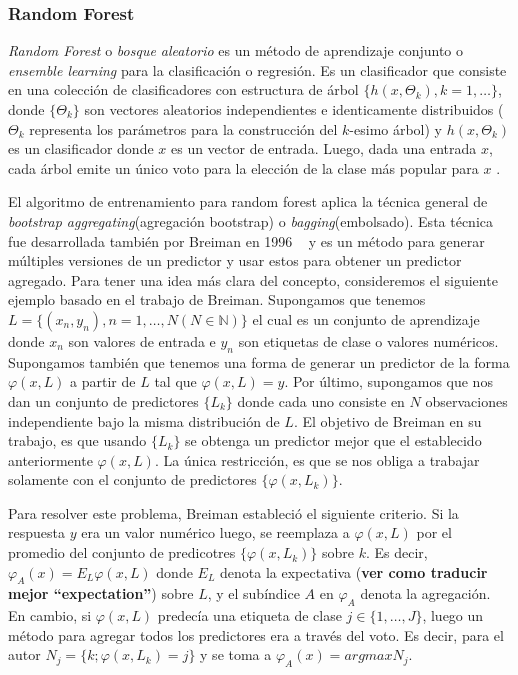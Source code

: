 \subsubsection{Random Forest}

	\textit{Random Forest} o \textit{bosque aleatorio} es un método de aprendizaje conjunto o\textit{ ensemble learning} para la clasificación o regresión. Es un clasificador que consiste en una colección de clasificadores con estructura de árbol $\{h(x,\Theta_k), k = 1,\dots\}$, donde $\{\Theta_k\}$ son vectores aleatorios independientes e identicamente distribuidos ($\Theta_k$ representa los parámetros para la construcción del $k$-esimo árbol) y $h(x,\Theta_k)$ es un clasificador donde $x$ es un vector de entrada. Luego, dada una entrada $x$, cada árbol emite un único voto para la elección de la clase más popular para $x$ \cite{Breiman01}.

	El algoritmo de entrenamiento para random forest aplica la técnica general de \textit{bootstrap aggregating}(agregación bootstrap) o \textit{bagging}(embolsado). Esta técnica fue desarrollada también por Breiman en 1996 ~\cite{LBreiman96} y es un método para generar múltiples versiones de un predictor y usar estos para obtener un predictor agregado. Para tener una idea más clara del concepto, consideremos el siguiente ejemplo basado en el trabajo de Breiman. Supongamos que tenemos $L = \{ (x_n,y_n), n = 1,\dots, N (N \in \mathbb{N}) \}$ el cual es un conjunto de aprendizaje donde $x_n$ son valores de entrada e $y_n$ son etiquetas de clase o valores numéricos. Supongamos también que tenemos una forma de generar un predictor de la forma $\varphi(x,L)$ a partir de $L$ tal que $ \varphi(x,L) = y $. Por último, supongamos que nos dan un conjunto de predictores $\{ L_k \}$ donde cada uno consiste en $N$ observaciones independiente bajo la misma distribución de $L$. El objetivo de Breiman en su trabajo, es que usando $\{ L_k \}$ se obtenga un predictor mejor que el establecido anteriormente $\varphi(x,L)$. La única restricción, es que se nos obliga a trabajar solamente con el conjunto de predictores $\{ \varphi(x, L_k)\} $. 
	
	Para resolver este problema, Breiman estableció el siguiente criterio. Si la respuesta $y$ era un valor numérico luego, se reemplaza a $\varphi(x,L)$ por el promedio del conjunto de predicotres $ \{ \varphi(x, L_k)\} $ sobre $k$. Es decir, $\varphi_A(x) = E_L\varphi(x,L)$ donde $E_L$ denota la expectativa (\textbf{ver como traducir mejor ``expectation''}) sobre $L$, y el subíndice $A$ en $\varphi_A$ denota la agregación. En cambio, si $ \varphi(x,L)$ predecía una etiqueta de clase $j \in \{ 1,\dots, J \} $, luego un método para agregar todos los predictores era a través del voto. Es decir, para el autor $N_j = \{ k;\varphi(x, L_k) = j \}$ y se toma a $\varphi_A(x) = argmax N_j$.
	
